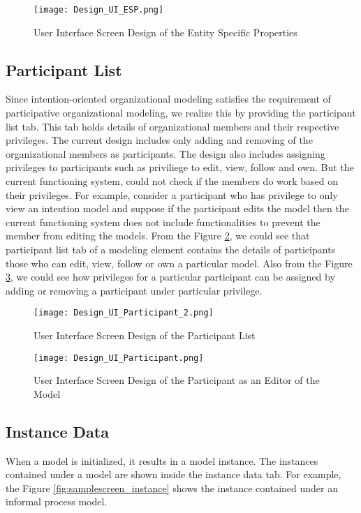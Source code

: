 \begin{figure} [H]
	\centering
	\texttt{[image: Design\_UI\_ESP.png]}
	\caption{User Interface Screen Design of the Entity Specific Properties}
	\label{fig:samplescreen_esp}
\end{figure}

\subsection{Participant List}
Since intention-oriented organizational modeling satisfies the requirement of participative organizational modeling, we realize this by providing the participant list tab. This tab holds details of organizational members and their respective privileges. The current design includes only adding and removing of the organizational members as participants. The design also includes assigning privileges to participants such as priviliege to edit, view, follow and own. But the current functioning system, could not check if the members do work based on their privileges. For example, consider a participant who has privilege to only view an intention model and suppose if the participant edits the model then the current functioning system does not include functionalities to prevent the member from editing the models. From the Figure \ref{fig:samplescreen_pl}, we could see that participant list tab of a modeling element contains the details of participants those who can edit, view, follow or own a particular model. Also from the Figure \ref{fig:samplescreen_pl_editor}, we could see how privileges for a particular participant can be assigned by adding or removing a participant under particular privilege.  
\begin{figure} [H]
	\centering
	\texttt{[image: Design\_UI\_Participant\_2.png]}
	\caption{User Interface Screen Design of the Participant List}
	\label{fig:samplescreen_pl}
\end{figure}

\begin{figure} [H]
	\centering
	\texttt{[image: Design\_UI\_Participant.png]}
	\caption{User Interface Screen Design of the Participant as an Editor of the Model}
	\label{fig:samplescreen_pl_editor}
\end{figure}

\subsection{Instance Data}
When a model is initialized, it results in a model instance. The instances contained under a model are shown inside the instance data tab. For example, the Figure \ref{fig:samplescreen_instance} shows the instance contained under an informal process model. 
  

